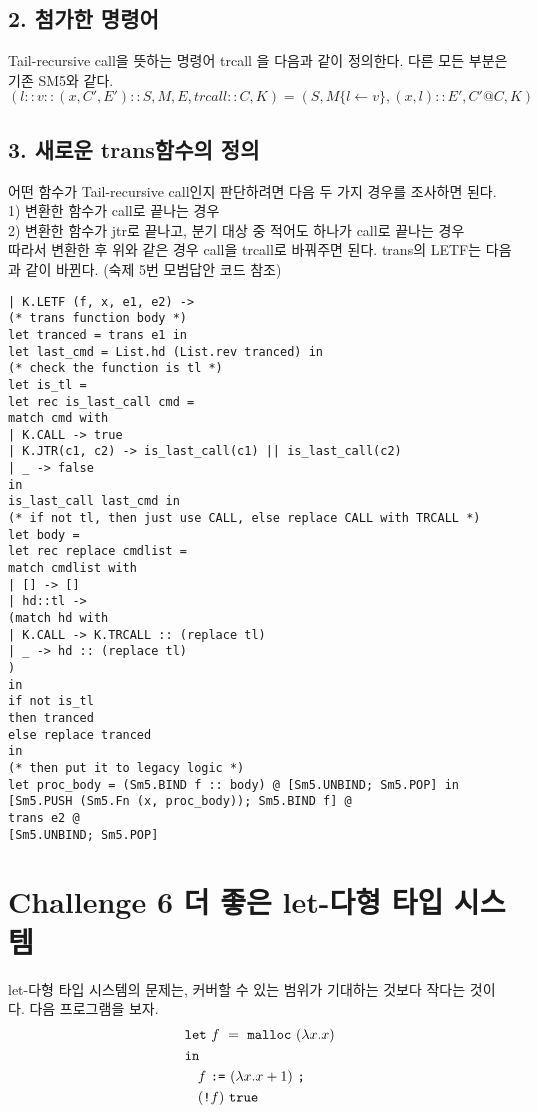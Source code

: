 \documentclass[a4paper]{article}
\begin{document}
\subsection*{2. 첨가한 명령어}
Tail-recursive call을 뜻하는 명령어 trcall 을 다음과 같이 정의한다. 다른 모든 부분은 기존 SM5와 같다.\\
\indent $(l::v::(x,C',E')::S, M, E, trcall::C, K) = (S, M\{l \leftarrow v\}, (x,l)::E', C' @ C, K)$\\
\subsection*{3. 새로운 trans함수의 정의}
어떤 함수가 Tail-recursive call인지 판단하려면 다음 두 가지 경우를 조사하면 된다.\\
1) 변환한 함수가 call로 끝나는 경우\\
2) 변환한 함수가 jtr로 끝나고, 분기 대상 중 적어도 하나가 call로 끝나는 경우\\
따라서 변환한 후 위와 같은 경우 call을 trcall로 바꿔주면 된다. trans의 LETF는 다음과 같이 바뀐다. (숙제 5번 모범답안 코드 참조)
\begin{verbatim}
| K.LETF (f, x, e1, e2) ->
(* trans function body *)
let tranced = trans e1 in
let last_cmd = List.hd (List.rev tranced) in
(* check the function is tl *)
let is_tl =
let rec is_last_call cmd =
match cmd with
| K.CALL -> true
| K.JTR(c1, c2) -> is_last_call(c1) || is_last_call(c2)
| _ -> false
in
is_last_call last_cmd in
(* if not tl, then just use CALL, else replace CALL with TRCALL *)
let body =
let rec replace cmdlist =
match cmdlist with
| [] -> []
| hd::tl ->
(match hd with
| K.CALL -> K.TRCALL :: (replace tl)
| _ -> hd :: (replace tl)
)
in
if not is_tl
then tranced
else replace tranced
in
(* then put it to legacy logic *)
let proc_body = (Sm5.BIND f :: body) @ [Sm5.UNBIND; Sm5.POP] in
[Sm5.PUSH (Sm5.Fn (x, proc_body)); Sm5.BIND f] @
trans e2 @
[Sm5.UNBIND; Sm5.POP]
\end{verbatim}

\section*{Challenge 6 더 좋은 let-다형 타입 시스템}
let-다형 타입 시스템의 문제는, 커버할 수 있는 범위가 기대하는 것보다 작다는 것이다. 다음 프로그램을 보자. 
\begin{align*}
&\texttt{let}\ f\ =\ \texttt{malloc}\ (\lambda x. x)\\
&\texttt{in} \\
&\hphantom{in} f\ \texttt{:=}\ (\lambda x. x + 1)\ \texttt{;} \\
&\hphantom{in} (\texttt{!}f)\ \texttt{true}\\
\end{align*}
\end{document}
